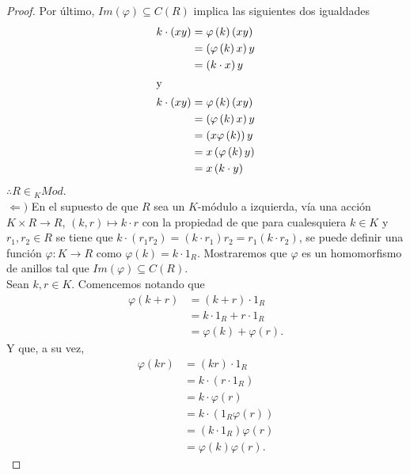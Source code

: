 \documentclass{article}
\newcommand{\lrprth}[1]{
	\left(#1\right)
}
\newcommand{\ringcenter}[1]{
	C\lrprth{#1}
}
\theoremstyle{definition}
\theoremstyle{plain}
\theoremstyle{plain}
\theoremstyle{definition}
\theoremstyle{definition}
\theoremstyle{definition}
\theoremstyle{definition}
\theoremstyle{definition}
\theoremstyle{definition}
\begin{document}
\begin{enumerate}[label=\textbf{Ej \arabic*.}]
\begin{proof}
			Por último, $Im\lrprth{ \varphi } \subseteq \ringcenter{R}$ implica las siguientes dos igualdades
			\begin{align*}
				k \cdot \lrprth{xy}&=\varphi \lrprth{k}\lrprth{xy}\\
				&=\lrprth{ \varphi \lrprth{k}x}y\\
				&=\lrprth{k \cdot x}y\\
				\intertext{y}
				k \cdot \lrprth{xy}& = \varphi \lrprth{k}\lrprth{xy}\\
				&=\lrprth{ \varphi \lrprth{k}x}y
				\\&=\lrprth{x \varphi \lrprth{k}}y\\
				&=x\lrprth{ \varphi \lrprth{k}y}\\
				&=x\lrprth{k \cdot y}
			\end{align*}
			$\therefore R \in {}_{K}Mod$.\\
			
			$\boxed{\Leftarrow )}$ En el supuesto de que $R$ sea un $K$-módulo a izquierda, vía una acción $K \times R \longrightarrow R$, $\lrprth{k,r} \mapsto k \cdot r$ con la propiedad de que para cualesquiera $k \in K$ y $r_{1},r_{2} \in R$ se tiene que $k \cdot \lrprth{r_{1}r_{2}} = \lrprth{k \cdot r_{1}}r_{2} = r_{1} \lrprth{k \cdot r_{2}}$, se puede definir una función $\varphi : K \longrightarrow R$ como $\varphi \lrprth{k} = k \cdot 1_{R}$. Mostraremos que $\varphi$ es un homomorfismo de anillos tal que $Im\lrprth{ \varphi } \subseteq \ringcenter{R}$.\\
			
			Sean $k,r \in K$. Comencemos notando que
			\begin{align*}
				\varphi \lrprth{k+r}&=\lrprth{k+r}\cdot 1_{R}\\
				&=k \cdot 1_{R}+r \cdot 1_{R}\\
				&=\varphi\lrprth{k}+\varphi\lrprth{r}.
			\end{align*}
			Y que, a su vez,
			\begin{align*}
				\varphi \lrprth{kr}& = \lrprth{kr} \cdot 1_{R}\\
				&= k \cdot \lrprth{r \cdot 1_{R}}\\
				&= k \cdot \varphi \lrprth{r}\\
				&= k \cdot \lrprth{1_{R} \varphi \lrprth{r}}\\
				&= \lrprth{k \cdot 1_{R}} \varphi \lrprth{r}\\
				&= \varphi \lrprth{k} \varphi \lrprth{r}.
			\end{align*}
			

\end{proof}
\end{enumerate}
\end{document}
